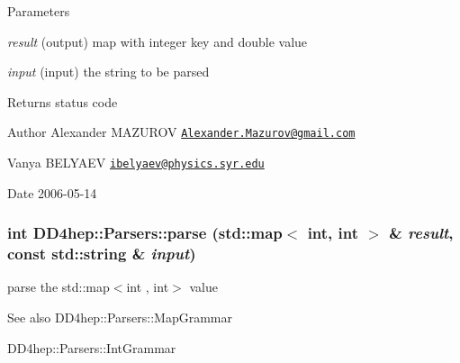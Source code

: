 \begin{DoxyParams}{Parameters}
\item[{\em result}](output) map with integer key and double value \item[{\em input}](input) the string to be parsed \end{DoxyParams}
\begin{DoxyReturn}{Returns}
status code
\end{DoxyReturn}
\begin{DoxyAuthor}{Author}
Alexander MAZUROV \href{mailto:Alexander.Mazurov@gmail.com}{\tt Alexander.Mazurov@gmail.com} 

Vanya BELYAEV \href{mailto:ibelyaev@physics.syr.edu}{\tt ibelyaev@physics.syr.edu} 
\end{DoxyAuthor}
\begin{DoxyDate}{Date}
2006-\/05-\/14 
\end{DoxyDate}
\hypertarget{namespace_d_d4hep_1_1_parsers_ac82777050fc05e43dcd2e5fa4648cfb5}{
\subsubsection[{parse}]{\setlength{\rightskip}{0pt plus 5cm}int DD4hep::Parsers::parse (std::map$<$ int, int $>$ \& {\em result}, \/  const std::string \& {\em input})}}
\label{namespace_d_d4hep_1_1_parsers_ac82777050fc05e43dcd2e5fa4648cfb5}


parse the {\ttfamily std::map$<$int , int$>$} value \begin{DoxySeeAlso}{See also}
DD4hep::Parsers::MapGrammar 

DD4hep::Parsers::IntGrammar 
\end{DoxySeeAlso}

